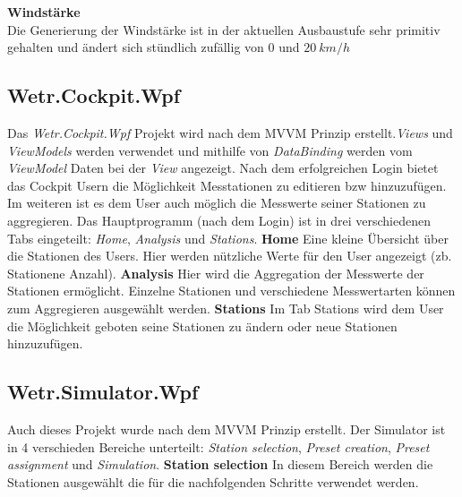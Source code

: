 \textbf{Windstärke}\\
Die Generierung der Windstärke ist in der aktuellen Ausbaustufe sehr primitiv gehalten und ändert sich stündlich zufällig von $0$ und $20\ km/h$


\newpage
\subsection{Wetr.Cockpit.Wpf}
Das \textit{Wetr.Cockpit.Wpf} Projekt wird nach dem MVVM Prinzip erstellt.\textit{Views} und \textit{ViewModels} werden verwendet und mithilfe von \textit{DataBinding} werden vom \textit{ViewModel} Daten bei der \textit{View} angezeigt. Nach dem erfolgreichen Login bietet das Cockpit Usern die Möglichkeit Messtationen zu editieren bzw hinzuzufügen. Im weiteren ist es dem User auch möglich die Messwerte seiner Stationen zu aggregieren.
\newline
\newline
Das Hauptprogramm (nach dem Login) ist in drei verschiedenen Tabs eingeteilt: \newline\textit{Home}, \textit{Analysis} und \textit{Stations}.
\newline
\newline
\textbf{Home}\newline
Eine kleine Übersicht über die Stationen des Users. Hier werden nützliche Werte für den User angezeigt (zb. Stationene Anzahl).
\newline
\newline
\textbf{Analysis}\newline
Hier wird die Aggregation der Messwerte der Stationen ermöglicht. Einzelne Stationen und verschiedene Messwertarten können zum Aggregieren ausgewählt werden.
\newline
\newline
\textbf{Stations}\newline
Im Tab Stations wird dem User die Möglichkeit geboten seine Stationen zu ändern oder neue Stationen hinzuzufügen.

\newpage
\subsection{Wetr.Simulator.Wpf}
Auch dieses Projekt wurde nach dem MVVM Prinzip erstellt.
Der Simulator ist in 4 verschieden Bereiche unterteilt: \textit{Station selection}, \textit{Preset creation}, \textit{Preset assignment} und \textit{Simulation}.
\newline
\newline
\textbf{Station selection}\newline
In diesem Bereich werden die Stationen ausgewählt die für die nachfolgenden Schritte verwendet werden.

